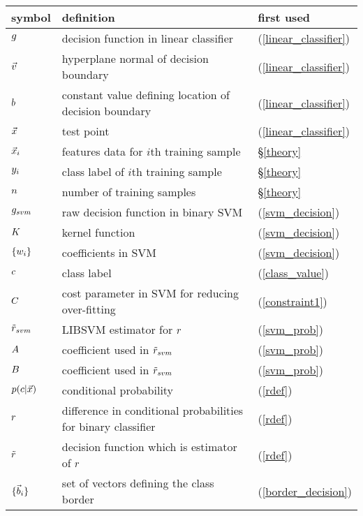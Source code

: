 
\begin{tabular}{lll}
symbol & definition & first used \\ \hline
	$g$ & decision function in linear classifier & (\ref{linear_classifier})\\
	$\vec v$ & hyperplane normal of decision boundary & (\ref{linear_classifier})\\
	$b$ & constant value defining location of decision boundary & (\ref{linear_classifier})\\
	$\vec {x}$ & test point & (\ref{linear_classifier})\\
	$\vec {x}_i$ & features data for $i$th training sample & \S \ref{theory} \\
	$y_i$ & class label of $i$th training sample & \S \ref{theory} \\
	$n$ & number of training samples & \S \ref{theory} \\
	$g_{svm}$ & raw decision function in binary SVM & (\ref{svm_decision})\\
	$K$ & kernel function & (\ref{svm_decision})\\
	$\lbrace w_i \rbrace$ & coefficients in SVM & (\ref{svm_decision})\\
	$c$ & class label & (\ref{class_value})\\
	$C$ & cost parameter in SVM for reducing over-fitting & (\ref{constraint1}) \\
	$\tilde r_{svm}$ & LIBSVM estimator for $r$ & (\ref{svm_prob}) \\
	$A$ & coefficient used in $\tilde r_{svm}$ & (\ref{svm_prob}) \\
	$B$ & coefficient used in $\tilde r_{svm}$ & (\ref{svm_prob}) \\
	$p(c|\vec {x})$ & conditional probability & (\ref{rdef}) \\
	$r$ & difference in conditional probabilities for binary classifier & (\ref{rdef}) \\
	$\tilde r$ & decision function which is estimator of $r$ & (\ref{rdef})\\
	$\lbrace \vec b_i \rbrace$ & set of vectors defining the class border & (\ref{border_decision}) \\

\end{tabular}
